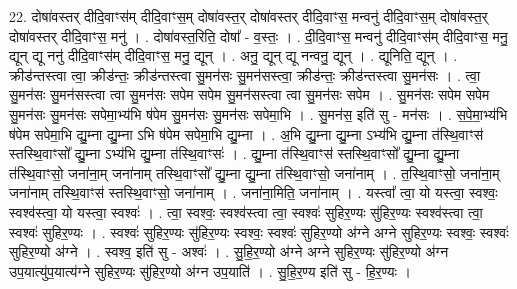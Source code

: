 \documentclass[17pt]{extarticle}
\begin{document}
22. दोषा॑वस्तर् दीदि॒वाꣳस॑म् दीदि॒वाꣳस॒म् दोषा॑वस्त॒र् दोषा॑वस्तर् दीदि॒वाꣳस॒ मन्वनु॑ दीदि॒वाꣳस॒म् दोषा॑वस्त॒र् दोषा॑वस्तर् दीदि॒वाꣳस॒ मनु॑ । . दोषा॑वस्त॒रिति॒ दोषा᳚ - व॒स्तः॒ । . दी॒दि॒वाꣳस॒ मन्वनु॑ दीदि॒वाꣳस॑म् दीदि॒वाꣳस॒ मनु॒ द्यून् द्यू ननु॑ दीदि॒वाꣳस॑म् दीदि॒वाꣳस॒ मनु॒ द्यून् । . अनु॒ द्यून् द्यू नन्वनु॒ द्यून् । . द्यूनिति॒ द्यून् । . क्रीड॑न्तस्त्वा त्वा॒ क्रीड॑न्तः॒ क्रीड॑न्तस्त्वा सु॒मन॑सः सु॒मन॑सस्त्वा॒ क्रीड॑न्तः॒ क्रीड॑न्तस्त्वा सु॒मन॑सः । . त्वा॒ सु॒मन॑सः सु॒मन॑सस्त्वा त्वा सु॒मन॑सः सपेम सपेम सु॒मन॑सस्त्वा त्वा सु॒मन॑सः सपेम । . सु॒मन॑सः सपेम सपेम सु॒मन॑सः सु॒मन॑सः सपेमा॒भ्य॑भि ष॑पेम सु॒मन॑सः सु॒मन॑सः सपेमा॒भि । . सु॒मन॑स॒ इति॑ सु - मन॑सः । . स॒पे॒मा॒भ्य॑भि ष॑पेम सपेमा॒भि द्यु॒म्ना द्यु॒म्ना ऽभि ष॑पेम सपेमा॒भि द्यु॒म्ना । . अ॒भि द्यु॒म्ना द्यु॒म्ना ऽभ्य॑भि द्यु॒म्ना त॑स्थि॒वाꣳस॑ स्तस्थि॒वाꣳसो᳚ द्यु॒म्ना ऽभ्य॑भि द्यु॒म्ना त॑स्थि॒वाꣳसः॑ । . द्यु॒म्ना त॑स्थि॒वाꣳस॑ स्तस्थि॒वाꣳसो᳚ द्यु॒म्ना द्यु॒म्ना त॑स्थि॒वाꣳसो॒ जना॑ना॒म् जना॑नाम् तस्थि॒वाꣳसो᳚ द्यु॒म्ना द्यु॒म्ना त॑स्थि॒वाꣳसो॒ जना॑नाम् । . त॒स्थि॒वाꣳसो॒ जना॑ना॒म् जना॑नाम् तस्थि॒वाꣳस॑ स्तस्थि॒वाꣳसो॒ जना॑नाम् । . जना॑ना॒मिति॒ जना॑नाम् । . यस्त्वा᳚ त्वा॒ यो यस्त्वा॒ स्वश्वः॒ स्वश्व॑स्त्वा॒ यो यस्त्वा॒ स्वश्वः॑ । . त्वा॒ स्वश्वः॒ स्वश्व॑स्त्वा त्वा॒ स्वश्वः॑ सुहिर॒ण्यः सु॑हिर॒ण्यः स्वश्व॑स्त्वा त्वा॒ स्वश्वः॑ सुहिर॒ण्यः । . स्वश्वः॑ सुहिर॒ण्यः सु॑हिर॒ण्यः स्वश्वः॒ स्वश्वः॑ सुहिर॒ण्यो अ॑ग्ने अग्ने सुहिर॒ण्यः स्वश्वः॒ स्वश्वः॑ सुहिर॒ण्यो अ॑ग्ने । . स्वश्व॒ इति॑ सु - अश्वः॑ । . सु॒हि॒र॒ण्यो अ॑ग्ने अग्ने सुहिर॒ण्यः सु॑हिर॒ण्यो अ॑ग्न उप॒यात्यु॑प॒यात्य॑ग्ने सुहिर॒ण्यः सु॑हिर॒ण्यो अ॑ग्न उप॒याति॑ । . सु॒हि॒र॒ण्य इति॑ सु - हि॒र॒ण्यः । \newline
\end{document}

